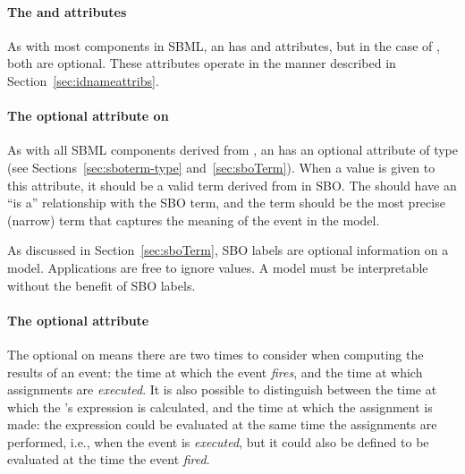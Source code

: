 \paragraph{The  and  attributes}
\label{sec:event-id-name}

As with most components in SBML, an \Event has  and
 attributes, but in the case of \Event, both are optional.
These attributes operate in the manner described in
Section~\ref{sec:idnameattribs}.


\paragraph{The optional  attribute on }
\label{sec:event-sboterm}

As with all SBML components derived from \SBase, an
  \Event has an optional attribute  of
  type   (see
  Sections~\ref{sec:sboterm-type} and~\ref{sec:sboTerm}).  When a
value is given to this attribute, it should be a valid
term derived from \sbointeraction in SBO.  The \Event should have an
``is a'' relationship with the SBO term, and the term should be
the most precise (narrow) term that captures the meaning of the
event in the model.

As discussed in Section~\ref{sec:sboTerm}, SBO labels are optional
information on a model.  Applications are free to ignore
 values.  A model must be interpretable without the
benefit of SBO labels.



\paragraph{The optional  attribute}
\label{sec:event-usevaluesfromtriggertime}

The optional \Delay on \Event means there are two times to
consider when computing the results of an event: the time at which
the event \emph{fires}, and the time at which assignments are
\emph{executed}.  It is also possible to distinguish between the
time at which the \EventAssignment's expression is calculated, and
the time at which the assignment is made: the expression could be
evaluated at the same time the assignments are
performed, i.e., when the event is \emph{executed}, but it could
also be defined to be evaluated at the time the event
\emph{fired}.

